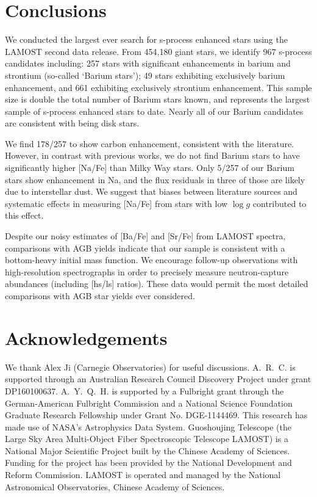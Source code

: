\documentclass[a4paper,fleqn,usenatbib]{mnras}
\begin{document}
\section{Conclusions} \label{sec:con}

We conducted the largest ever search for s-process enhanced stars using the LAMOST second data release. From 454,180 giant stars, we identify 967 s-process candidates including: 257 stars with significant enhancements in barium and strontium (so-called `Barium stars'); 49 stars exhibiting exclusively barium enhancement, and 661 exhibiting exclusively strontium enhancement. This sample size is double the total number of Barium stars known, and represents the largest sample of s-process enhanced stars to date. Nearly all of our Barium candidates are consistent with being disk stars. 

We find 178/257 to show carbon enhancement, consistent with the literature. However, in contrast with previous works, we do not find Barium stars to have significantly higher [Na/Fe] than Milky Way stars. Only 5/257 of our Barium stars show enhancement in Na, and the flux residuals in three of those are likely due to interstellar dust. We suggest that biases between literature sources and systematic effects in measuring [Na/Fe] from stars with low $\log{g}$ contributed to this effect. 

Despite our noisy estimates of [Ba/Fe] and [Sr/Fe] from LAMOST spectra, comparisons with AGB yields indicate that our sample is consistent with a bottom-heavy initial mass function. We encourage follow-up observations with high-resolution spectrographs in order to precisely measure neutron-capture abundances (including [hs/ls] ratios). These data would permit the most detailed comparisons with AGB star yields ever considered.

 

\section*{Acknowledgements}
We thank Alex Ji (Carnegie Observatories) for useful discussions.
A.~R.~C. is supported through an Australian Research Council Discovery Project under grant DP160100637.
A.~Y.~Q.~H. is supported by a Fulbright grant through the German-American Fulbright Commission and a National Science Foundation Graduate Research Fellowship under Grant No. DGE-1144469. 
This research has made use of NASA's Astrophysics Data System.
Guoshoujing Telescope (the Large Sky Area Multi-Object Fiber Spectroscopic Telescope LAMOST) is a National Major Scientific Project built by the Chinese Academy of Sciences. Funding for the project has been provided by the National Development and Reform Commission. LAMOST is operated and managed by the National Astronomical Observatories, Chinese Academy of Sciences.
\end{document}
